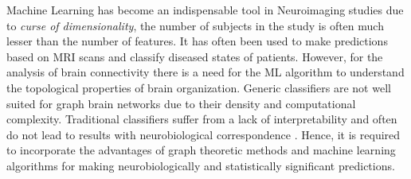 \documentclass[msthesis.tex]{subfiles}
\begin{document}
Machine Learning has become an indispensable tool in Neuroimaging studies due to \textit{curse of dimensionality}, the number of subjects in the study is often much lesser than the number of features. It has often been used to make predictions based on \gls{MRI} scans and classify diseased states of patients. However, for the analysis of brain connectivity there is a need for the \gls{ML} algorithm to understand the topological properties of brain organization. Generic classifiers are not well suited for graph brain networks due to their density and computational complexity. Traditional classifiers suffer from a lack of interpretability and often do not lead to results with neurobiological correspondence \citep{10.3389/fnagi.2017.00329}. Hence, it is required to incorporate the advantages of graph theoretic methods and machine learning algorithms for making neurobiologically and statistically significant predictions. 
\end{document}
